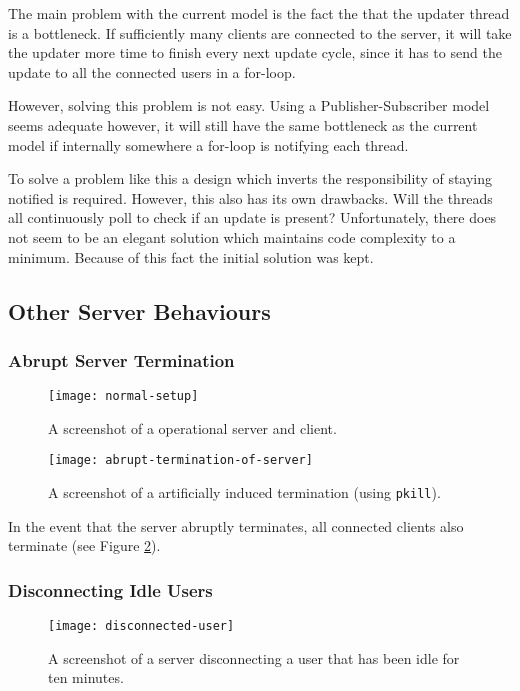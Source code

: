 \documentclass[article]{uom-coursework}
\begin{document}
The main problem with the current model is the fact the that the
updater thread is a bottleneck. If sufficiently many clients are
connected to the server, it will take the updater more time to
finish every next update cycle, since it has to send the update
to all the connected users in a for-loop.

However, solving this problem is not easy. Using a
Publisher-Subscriber model seems adequate however, it will still
have the same bottleneck as the current model if internally
somewhere a for-loop is notifying each thread.

To solve a problem like this a design which inverts the
responsibility of staying notified is required. However, this
also has its own drawbacks. Will the threads all continuously
poll to check if an update is present? Unfortunately, there does
not seem to be an elegant solution which maintains code
complexity to a minimum. Because of this fact the initial
solution was kept.

\subsection{Other Server Behaviours}

\subsubsection{Abrupt Server Termination}

\begin{figure}[H]
\centering
\texttt{[image: normal-setup]}
\caption{A screenshot of a operational server and client.}
\label{fig:normalsetup}
\end{figure}

\begin{figure}[H]
\centering
\texttt{[image: abrupt-termination-of-server]}
\caption{A screenshot of a artificially induced termination
(using \texttt{pkill}).}
\label{fig:abrupttermination}
\end{figure}

In the event that the server abruptly terminates, all connected
clients also terminate (see Figure \ref{fig:abrupttermination}).

\subsubsection{Disconnecting Idle Users}

\begin{figure}[H]
\centering
\texttt{[image: disconnected-user]}
\caption{A screenshot of a server disconnecting a user that has
been idle for ten minutes.}
\label{fig:idleuser}
\end{figure}
\end{document}
